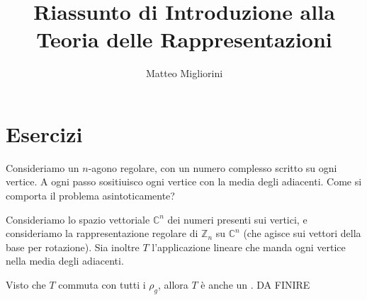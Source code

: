 \documentclass[a4paper,10pt,oneside]{math_article}
\title{Riassunto di Introduzione alla Teoria delle Rappresentazioni}
\author{Matteo Migliorini}
\date{}
\newcommand{\Cyc}{\mathbb Z}
\begin{document}
 
 
 \maketitle
 
 \cleardoublepage	
 
 \cleardoublepage
 \tableofcontents
 \cleardoublepage
 
 
 
 
 
 
 
 
 
 

  \section{Esercizi}
  \begin{myex}
   Consideriamo un $n$-agono regolare, con un numero complesso scritto su ogni vertice. A ogni passo sositiuisco ogni vertice con la media degli adiacenti. Come si comporta il problema asintoticamente?
   
   Consideriamo lo spazio vettoriale $\mathbb C^n$ dei numeri presenti sui vertici, e consideriamo la rappresentazione regolare di $\Cyc_n$ su $\mathbb C^n$ (che agisce sui vettori della base per rotazione). Sia inoltre $T$ l'applicazione lineare che manda ogni vertice nella media degli adiacenti.
   
   Visto che $T$ commuta con tutti i $\rho_g$, allora $T$ è anche un . DA FINIRE
  \end{myex}
\end{document}
